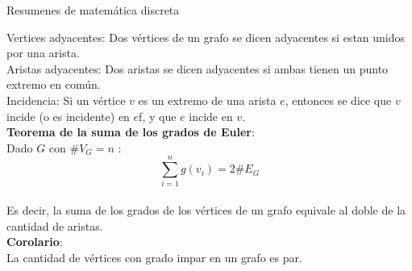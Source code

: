 \documentclass[a4paper,11pt]{report}
\begin{document}
\begin{center}
Resumenes de matemática discreta \\
\end{center}
Vertices adyacentes: Dos vértices de un grafo se dicen adyacentes si estan unidos por una arista.\\
Aristas adyacentes: Dos aristas se dicen adyacentes si ambas tienen un punto extremo en común. \\
Incidencia: Si un vértice $v$ es un extremo de una arista $e$, entonces se dice que $v$ incide (o es incidente) en $e$f, y que $e$ incide en $v$.\\
{\bf Teorema de la suma de los grados de Euler}: \\
Dado $G$ con \#$V_G=n$ : \\
$$\displaystyle \sum_{i=1}^{n} g(v_i) =2\#E_G$$\\
Es decir, la suma de los grados de los vértices de un grafo equivale al doble de la cantidad de aristas.\\
{\bf Corolario}:\\
La cantidad de vértices con grado impar en un grafo es par.
\end{document}
